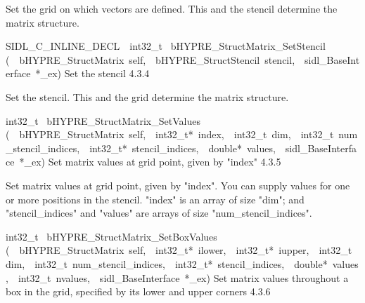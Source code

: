 \documentclass{article}
\begin{document}
\begin{cxxentry}
\begin{cxxentry}
\begin{cxxfunction}
\begin{cxxdoc}
Set the grid on which vectors are defined.  This and the stencil
determine the matrix structure. 
\end{cxxdoc}
\end{cxxfunction}
\begin{cxxfunction}
{SIDL\_C\_INLINE\_DECL\ \ int32\_t\ }
        {bHYPRE\_StructMatrix\_SetStencil}
        {(\ \ bHYPRE\_StructMatrix\ self,\ \ bHYPRE\_StructStencil\ stencil,\ \ sidl\_BaseInterface\ *\_ex)}
        {
Set the stencil}
        {4.3.4}
\begin{cxxdoc}

Set the stencil. This and the grid determine the matrix structure. 
\end{cxxdoc}
\end{cxxfunction}
\begin{cxxfunction}
{int32\_t\ }
        {bHYPRE\_StructMatrix\_SetValues}
        {(\ \ bHYPRE\_StructMatrix\ self,\ \ int32\_t*\ index,\ \ int32\_t\ dim,\ \ int32\_t\ num\_stencil\_indices,\ \ int32\_t*\ stencil\_indices,\ \ double*\ values,\ \ sidl\_BaseInterface\ *\_ex)}
        {
Set matrix values at grid point, given by "index"}
        {4.3.5}
\begin{cxxdoc}

Set matrix values at grid point, given by "index".
You can supply values for one or more positions in the stencil.
"index" is an array of size "dim"; and "stencil\_indices" and "values"
are arrays of size "num\_stencil\_indices".
\end{cxxdoc}
\end{cxxfunction}
\begin{cxxfunction}
{int32\_t\ }
        {bHYPRE\_StructMatrix\_SetBoxValues}
        {(\ \ bHYPRE\_StructMatrix\ self,\ \ int32\_t*\ ilower,\ \ int32\_t*\ iupper,\ \ int32\_t\ dim,\ \ int32\_t\ num\_stencil\_indices,\ \ int32\_t*\ stencil\_indices,\ \ double*\ values,\ \ int32\_t\ nvalues,\ \ sidl\_BaseInterface\ *\_ex)}
        {
Set matrix values throughout a box in the grid, specified by its lower
and upper corners}
        {4.3.6}
\begin{cxxdoc}


\end{cxxdoc}
\end{cxxfunction}
\end{cxxentry}
\end{cxxentry}
\end{document}
